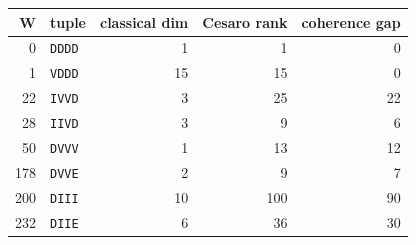 \begin{tabular}{@{}rl rrr@{}}
\toprule
W & tuple & classical dim & Cesaro rank & coherence gap \\
\midrule
0 & \texttt{DDDD} & 1 & 1 & 0 \\
1 & \texttt{VDDD} & 15 & 15 & 0 \\
22 & \texttt{IVVD} & 3 & 25 & 22 \\
28 & \texttt{IIVD} & 3 & 9 & 6 \\
50 & \texttt{DVVV} & 1 & 13 & 12 \\
178 & \texttt{DVVE} & 2 & 9 & 7 \\
200 & \texttt{DIII} & 10 & 100 & 90 \\
232 & \texttt{DIIE} & 6 & 36 & 30 \\
\bottomrule
\end{tabular}
